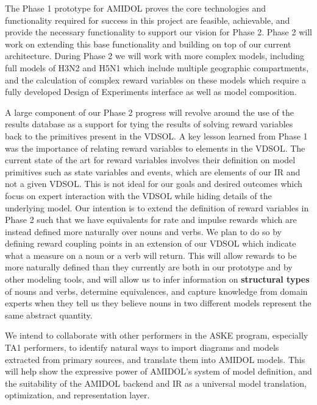 \documentclass[11pt]{article}
\newcommand{\amidol}{\textsc{AMIDOL}}
\begin{document}
The Phase 1 prototype for \amidol{} proves the core technologies and functionality required for success in this project are feasible, achievable, and provide the necessary functionality to support our vision for Phase 2.  Phase 2 will work on extending this base functionality and building on top of our current architecture.  During Phase 2 we will work with more complex models, including full models of H3N2 and H5N1 which include multiple geographic compartments, and the calculation of complex reward variables on these models which require a fully developed Design of Experiments interface as well as model composition.

A large component of our Phase 2 progress will revolve around the use of the results database as a support for tying the results of solving reward variables back to the primitives present in the VDSOL.  A key lesson learned from Phase 1 was the importance of relating reward variables to elements in the VDSOL.  The current state of the art for reward variables involves their definition on model primitives such as state variables and events, which are elements of our IR and not a given VDSOL.  This is not ideal for our goals and desired outcomes which focus on expert interaction with the VDSOL while hiding details of the underlying model.  Our intention is to extend the definition of reward variables in Phase 2 such that we have equivalents for rate and impulse rewards which are instead defined more naturally over nouns and verbs.  We plan to do so by defining reward coupling points in an extension of our VDSOL which indicate what a measure on a noun or a verb will return.  This will allow rewards to be more naturally defined than they currently are both in our prototype and by other modeling tools, and will allow us to infer information on \textbf{structural types} of nouns and verbs, determine equivalences, and capture knowledge from domain experts when they tell us they believe nouns in two different models represent the same abstract quantity.

We intend to collaborate with other performers in the ASKE program, especially TA1 performers, to identify natural ways to import diagrams and models extracted from primary sources, and translate them into \amidol{} models.  This will help show the expressive power of \amidol{}'s system of model definition, and the suitability of the \amidol{} backend and IR as a universal model translation, optimization, and representation layer.


\end{document}
